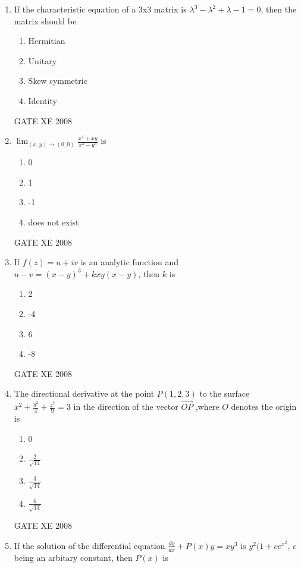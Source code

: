 \documentclass[12pt]{article}
\begin{document}
\begin{enumerate}
\item If the characteristic equation of a 3x3 matrix is $\lambda^3 - \lambda^2 + \lambda - 1 =0$, then the matrix should be 

\begin{enumerate}

\item  Hermitian 
\item Unitary
 \item Skew symmetric
\item Identity

\end{enumerate}

GATE XE 2008

\item {\large $\lim_{(x,y) \to (0,0)} \frac{x^4 + xy}{x^3 - y^3} $} is

\begin{enumerate}
\item 0
\item 1
\item -1
\item does not exist

\end{enumerate}
GATE XE 2008
\item If $f(z)= u + iv$ is an analytic function and $u-v=(x-y)^3 + kxy(x-y)$, then $k$ is

\begin{enumerate}
\item  2
\item  -4
\item  6
\item -8
\end{enumerate}

GATE XE 2008
\item The directional derivative at the point $P(1,2,3)$ to the surface {\large $x^2 + \frac{y^2}{4} + \frac{z^2}{9} =3$} in the direction of the vector $\overrightarrow{OP}$ ,where $O$ denotes the origin is

\begin{enumerate}
\item 0
\item {\Large $\frac{2}{\sqrt{14}}$}
\item {\Large $\frac{3}{\sqrt{14}}$}
\item {\Large $\frac{6}{\sqrt{14}}$}
\end{enumerate}

GATE XE 2008
\item If the solution of the differential equation $\frac{dy}{dx} + P(x)y = xy^3$ is $y^2(1+ce^{x^2}$, $c$ being an arbitary constant, then $P(x)$ is


\end{enumerate}
\end{document}
